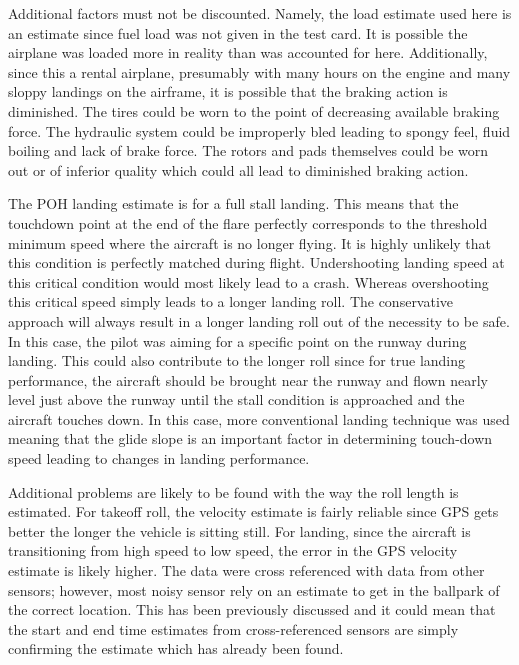 \documentclass[conf]{new-aiaa}
\begin{document}
Additional factors must not be discounted. Namely, the load estimate used here is an estimate since fuel load was not given in the test card. It is possible the airplane was loaded more in reality than was accounted for here. Additionally, since this a rental airplane, presumably with many hours on the engine and many sloppy landings on the airframe, it is possible that the braking action is diminished. The tires could be worn to the point of decreasing available braking force. The hydraulic system could be improperly bled leading to spongy feel, fluid boiling and lack of brake force. The rotors and pads themselves could be worn out or of inferior quality which could all lead to diminished braking action.

The POH landing estimate is for a full stall landing. This means that the touchdown point at the end of the flare perfectly corresponds to the threshold minimum speed where the aircraft is no longer flying. It is highly unlikely that this condition is perfectly matched during flight. Undershooting landing speed at this critical condition would most likely lead to a crash. Whereas overshooting this critical speed simply leads to a longer landing roll. The conservative approach will always result in a longer landing roll out of the necessity to be safe. In this case, the pilot was aiming for a specific point on the runway during landing. This could also contribute to the longer roll since for true landing performance, the aircraft should be brought near the runway and flown nearly level just above the runway until the stall condition is approached and the aircraft touches down. In this case, more conventional landing technique was used meaning that the glide slope is an important factor in determining touch-down speed leading to changes in landing performance.

Additional problems are likely to be found with the way the roll length is estimated. For takeoff roll, the velocity estimate is fairly reliable since GPS gets better the longer  the vehicle is sitting still. For landing, since the aircraft is transitioning from high speed to low speed, the error in the GPS velocity estimate is likely higher. The data were cross referenced with data from other sensors; however, most noisy sensor rely on an estimate to get in the ballpark of the correct location. This has been previously discussed and it could mean that the start and end time estimates from cross-referenced sensors are simply confirming the estimate which has already been found.
\end{document}
